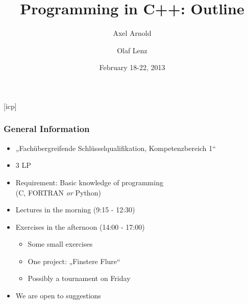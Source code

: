 \documentclass{slides}
\begin{document}
\newcommand{\ie}{\textit{i.\thinspace e.}\xspace}
\newcommand{\eg}{\textit{e.\thinspace g.}\xspace}

\graphicspath{{figures/}}

\title[Programming in C++: Outline]{\Large Programming in C++: Outline}

\author[A. Arnold and O. Lenz]{Axel Arnold \and Olaf Lenz} 
\date{February 18-22, 2013}

\begin{frame}
  \titlepage
\end {frame}
[icp]

\begin{frame}
  \frametitle{General Information}
  \begin{itemize}
  \item „Fachübergreifende Schlüsselqualifikation, Kompetenzbereich 1“
  \item 3 LP
  \item Requirement: Basic knowledge of programming\\ (C, FORTRAN \emph{or} Python)
  \item Lectures in the morning (9:15 - 12:30)
  \item Exercises in the afternoon (14:00 - 17:00)
    \begin{itemize}
    \item Some small exercises
    \item One project: „Finstere Flure“
    \item Possibly a tournament on Friday
    \end{itemize}
  \item We are open to suggestions
  \end{itemize}
\end{frame}
\end{document}
